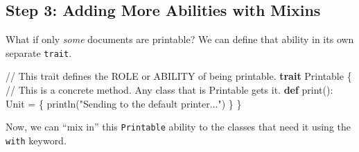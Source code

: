 \documentclass[
  letterpaper,
  DIV=11,
  numbers=noendperiod]{scrreprt}
\newenvironment{Shaded}{\begin{snugshade}}{\end{snugshade}}
\newcommand{\BuiltInTok}[1]{\textcolor[rgb]{0.00,0.23,0.31}{#1}}
\newcommand{\CommentTok}[1]{\textcolor[rgb]{0.37,0.37,0.37}{#1}}
\newcommand{\ExtensionTok}[1]{\textcolor[rgb]{0.00,0.23,0.31}{#1}}
\newcommand{\FunctionTok}[1]{\textcolor[rgb]{0.28,0.35,0.67}{#1}}
\newcommand{\KeywordTok}[1]{\textcolor[rgb]{0.00,0.23,0.31}{\textbf{#1}}}
\newcommand{\OperatorTok}[1]{\textcolor[rgb]{0.37,0.37,0.37}{#1}}
\newcommand{\StringTok}[1]{\textcolor[rgb]{0.13,0.47,0.30}{#1}}
\begin{document}
\subsection{Step 3: Adding More Abilities with
Mixins}\label{step-3-adding-more-abilities-with-mixins}

What if only \emph{some} documents are printable? We can define that
ability in its own separate \texttt{trait}.

\begin{Shaded}
\begin{Highlighting}[]
\CommentTok{// This trait defines the ROLE or ABILITY of being printable.}
\KeywordTok{trait} \ExtensionTok{Printable} \OperatorTok{\{}
  \CommentTok{// This is a concrete method. Any class that is Printable gets it.}
  \KeywordTok{def} \FunctionTok{print}\OperatorTok{():} \BuiltInTok{Unit} \OperatorTok{=} \OperatorTok{\{}
    \FunctionTok{println}\OperatorTok{(}\StringTok{"Sending to the default printer..."}\OperatorTok{)}
  \OperatorTok{\}}
\OperatorTok{\}}
\end{Highlighting}
\end{Shaded}

Now, we can ``mix in'' this \texttt{Printable} ability to the classes
that need it using the \texttt{with} keyword.
\end{document}
